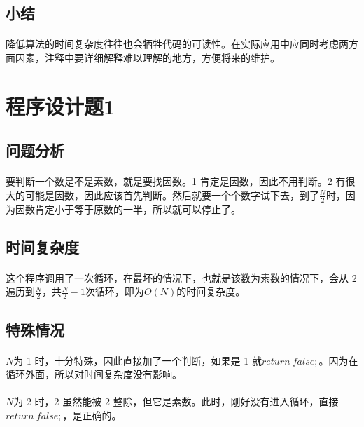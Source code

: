 \documentclass[UTF-8, 12pt]{ctexart}
\begin{document}
    \subsection{小结}
    \paragraph{}
    降低算法的时间复杂度往往也会牺牲代码的可读性。在实际应用中应同时考虑两方面因素，注释中要详细解释难以理解的地方，方便将来的维护。

\section{程序设计题1}
    \subsection{问题分析}
    \paragraph{}
    要判断一个数是不是素数，就是要找因数。1 肯定是因数，因此不用判断。2 有很大的可能是因数，因此应该首先判断。然后就要一个个数字试下去，到了$\frac{N}{2}$时，因为因数肯定小于等于原数的一半，所以就可以停止了。

    \subsection{时间复杂度}
    \paragraph{}
    这个程序调用了一次循环，在最坏的情况下，也就是该数为素数的情况下，会从 2 遍历到$\frac{N}{2}$，共$\frac{N}{2} -1$次循环，即为$O(N)$的时间复杂度。

    \subsection{特殊情况}
    \paragraph{}
    $N$为 1 时，十分特殊，因此直接加了一个判断，如果是 1 就$return \ false;$。因为在循环外面，所以对时间复杂度没有影响。
    \paragraph{}
    $N$为 2 时，2 虽然能被 2 整除，但它是素数。此时，刚好没有进入循环，直接$return \ false;$，是正确的。
\end{document}
